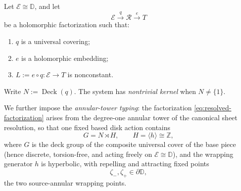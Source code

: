 \begin{definition}\label{def:canonical-resolved-system}
Let \(\mathcal E\cong\mathbb D\), and let
\begin{equation}\label{eq:resolved-factorization}
\mathcal E \xrightarrow{\ q\ } \mathcal R \xrightarrow{\ e\ } T
\end{equation}
be a holomorphic factorization such that:
\begin{enumerate}
\item \(q\) is a universal covering;
\item \(e\) is a holomorphic embedding;
\item \(L:=e\circ q\colon\mathcal E\to T\) is nonconstant.
\end{enumerate}
Write \(N:=\operatorname{Deck}(q)\).  The system has \emph{nontrivial kernel} when \(N\ne\{1\}\).

We further impose the \emph{annular-tower typing}: the factorization \eqref{eq:resolved-factorization} arises from the degree-one annular tower of the canonical sheet resolution, so that one fixed based disk action contains
\begin{equation}\label{eq:semidirect}
G=N\rtimes H,\qquad H=\langle h\rangle\cong\mathbb Z,
\end{equation}
where \(G\) is the deck group of the composite universal cover of the base piece (hence discrete, torsion-free, and acting freely on \(\mathcal E\cong\mathbb D\)), and the wrapping generator \(h\) is hyperbolic, with repelling and attracting fixed points
\begin{equation}\label{eq:wrapping-points}
\zeta_-,\zeta_+\in\partial\mathbb D,
\end{equation}
the two source-annular wrapping points.
\end{definition}

